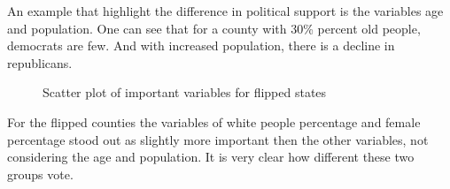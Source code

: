 An example that highlight the difference in political support is the variables age and population. One can see that for a county with 30\% percent old people, democrats are few. And with increased population, there is a decline in republicans.

\begin{figure}[H]
\centering
{}
\hfill
{}
\caption{Scatter plot of important variables for flipped states}
\end{figure}
For the flipped counties the variables of white people percentage and female percentage stood out as slightly more important then the other variables, not considering the age and population. It is very clear how different these two groups vote.